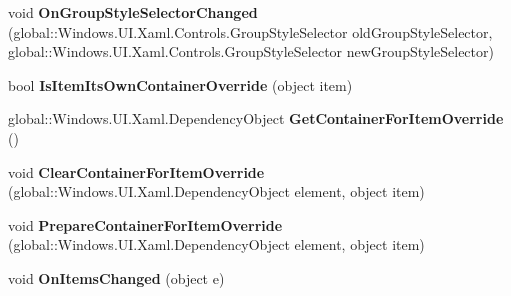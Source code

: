 \begin{DoxyCompactItemize}
\mbox{\label{interface_windows_1_1_u_i_1_1_xaml_1_1_controls_1_1_i_items_control_overrides_ac04335f529637477b2da0ba46ef61142}} 
void {\bfseries On\+Group\+Style\+Selector\+Changed} (global\+::\+Windows.\+U\+I.\+Xaml.\+Controls.\+Group\+Style\+Selector old\+Group\+Style\+Selector, global\+::\+Windows.\+U\+I.\+Xaml.\+Controls.\+Group\+Style\+Selector new\+Group\+Style\+Selector)
\item 
\mbox{\label{interface_windows_1_1_u_i_1_1_xaml_1_1_controls_1_1_i_items_control_overrides_ad9d9073fc349d2a457c581129484ff0f}} 
bool {\bfseries Is\+Item\+Its\+Own\+Container\+Override} (object item)
\item 
\mbox{\label{interface_windows_1_1_u_i_1_1_xaml_1_1_controls_1_1_i_items_control_overrides_a623f7e1da828fb4e0ab4990fc2047874}} 
global\+::\+Windows.\+U\+I.\+Xaml.\+Dependency\+Object {\bfseries Get\+Container\+For\+Item\+Override} ()
\item 
\mbox{\label{interface_windows_1_1_u_i_1_1_xaml_1_1_controls_1_1_i_items_control_overrides_aa7629a88ebc4029aab0c438c06ec0b82}} 
void {\bfseries Clear\+Container\+For\+Item\+Override} (global\+::\+Windows.\+U\+I.\+Xaml.\+Dependency\+Object element, object item)
\item 
\mbox{\label{interface_windows_1_1_u_i_1_1_xaml_1_1_controls_1_1_i_items_control_overrides_a4ebcd3ec353d6e23fb9fc344cc643e0e}} 
void {\bfseries Prepare\+Container\+For\+Item\+Override} (global\+::\+Windows.\+U\+I.\+Xaml.\+Dependency\+Object element, object item)
\item 
\mbox{\label{interface_windows_1_1_u_i_1_1_xaml_1_1_controls_1_1_i_items_control_overrides_aeca7ab8e157178a6cc021cee26bf5388}} 
void {\bfseries On\+Items\+Changed} (object e)
\item 
\mbox{\label{interface_windows_1_1_u_i_1_1_xaml_1_1_controls_1_1_i_items_control_overrides_aec19844110896dfbbe9fb5a9ddea5cea}} 

\end{DoxyCompactItemize}
